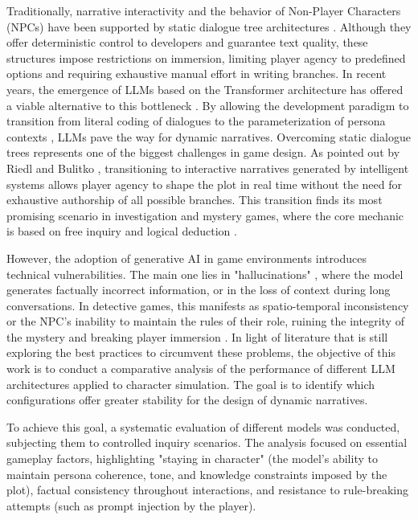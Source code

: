 \documentclass[12pt]{article}
\begin{document}
Traditionally, narrative interactivity and the behavior of Non-Player Characters (NPCs) have been supported by static dialogue tree architectures \cite{ref1}. Although they offer deterministic control to developers and guarantee text quality, these structures impose restrictions on immersion, limiting player agency to predefined options and requiring exhaustive manual effort in writing branches. In recent years, the emergence of LLMs based on the Transformer architecture has offered a viable alternative to this bottleneck \cite{ref4}. By allowing the development paradigm to transition from literal coding of dialogues to the parameterization of persona contexts \cite{ref2}, LLMs pave the way for dynamic narratives. Overcoming static dialogue trees represents one of the biggest challenges in game design. As pointed out by Riedl and Bulitko \cite{riedl2013}, transitioning to interactive narratives generated by intelligent systems allows player agency to shape the plot in real time without the need for exhaustive authorship of all possible branches. This transition finds its most promising scenario in investigation and mystery games, where the core mechanic is based on free inquiry and logical deduction \cite{ref7}.

However, the adoption of generative AI in game environments introduces technical vulnerabilities. The main one lies in "hallucinations" \cite{ref10}, where the model generates factually incorrect information, or in the loss of context during long conversations. In detective games, this manifests as spatio-temporal inconsistency or the NPC's inability to maintain the rules of their role, ruining the integrity of the mystery and breaking player immersion \cite{ref13}. In light of literature that is still exploring the best practices to circumvent these problems, the objective of this work is to conduct a comparative analysis of the performance of different LLM architectures applied to character simulation. The goal is to identify which configurations offer greater stability for the design of dynamic narratives.

To achieve this goal, a systematic evaluation of different models was conducted, subjecting them to controlled inquiry scenarios. The analysis focused on essential gameplay factors, highlighting "staying in character" (the model's ability to maintain persona coherence, tone, and knowledge constraints imposed by the plot), factual consistency throughout interactions, and resistance to rule-breaking attempts (such as prompt injection by the player).
\end{document}
